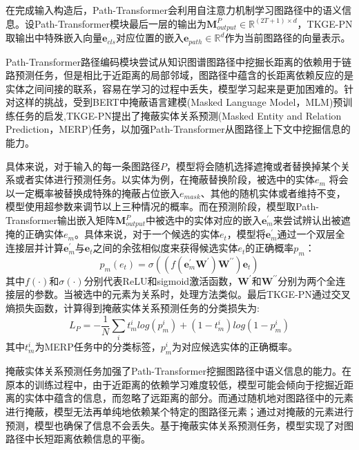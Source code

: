 在完成输入构造后，Path-Transformer会利用自注意力机制学习图路径中的语义信息。设Path-Transformer模块最后一层的输出为$\mathbf{M}_{output}^{P}\in\mathbb{R}^{(2T+1)\times d}$，TKGE-PN取输出中特殊嵌入向量$\boldsymbol{e}_{cls}$对应位置的嵌入$\boldsymbol{e}_{path}\in\mathbb{R}^d$作为当前图路径的向量表示。

Path-Transformer路径编码模块尝试从知识图谱图路径中挖掘长距离的依赖用于链路预测任务，但是相比于近距离的局部邻域，图路径中蕴含的长距离依赖反应的是实体之间间接的联系，容易在学习的过程中丢失，模型学习起来是更加困难的。针对这样的挑战，受到BERT中掩蔽语言建模(Masked Language Model，MLM)预训练任务的启发,TKGE-PN提出了掩蔽实体关系预测(Masked Entity and Relation Prediction，MERP)任务，以加强Path-Transformer从图路径上下文中挖掘信息的能力。

具体来说，对于输入的每一条图路径$P$，模型将会随机选择遮掩或者替换掉某个关系或者实体进行预测任务。以实体为例，在掩蔽替换阶段，被选中的实体$e_m$ 将会以一定概率被替换成特殊的掩蔽占位嵌入$e_{mask}$、其他的随机实体或者维持不变，模型使用超参数来调节以上三种情况的概率。而在预测阶段，模型取Path-Transformer输出嵌入矩阵$\mathbf{M}_{output}^{P}$中被选中的实体对应的嵌入$\boldsymbol{e}_{m}^\prime$来尝试辨认出被遮掩的正确实体$e_m$。具体来说，对于一个候选的实体$e_t$，模型将$\boldsymbol{e}_{m}^\prime$通过一个双层全连接层并计算$\boldsymbol{e}_{m}^\prime$与$\boldsymbol{e}_{t}$之间的余弦相似度来获得候选实体$e_t$的正确概率$p_m$：
\begin{equation}
  p_m(e_t)=\sigma((f(\boldsymbol{e}_m^\prime\mathbf{W}^{\prime})\mathbf{W}^{\prime\prime})\boldsymbol{e}_t)
\end{equation}
其中$f (\cdot)$和$\sigma(\cdot)$分别代表ReLU和sigmoid激活函数，$\mathbf{W}^{\prime}$和$\mathbf{W}^{\prime\prime}$分别为两个全连接层的参数。当被选中的元素为关系时，处理方法类似。最后TKGE-PN通过交叉熵损失函数，计算得到掩蔽实体关系预测任务的分类损失为:
\begin{equation}
  L_{P} = -\frac{1}{N}\sum\limits_{i}t_m^ilog(p_m^i)+(1-t_m^i)log(1-p_m^i)
\end{equation}
其中$t_m^i$为MERP任务中的分类标签，$p_m^i$为对应候选实体的正确概率。

掩蔽实体关系预测任务加强了Path-Transformer挖掘图路径中语义信息的能力。在原本的训练过程中，由于近距离的依赖学习难度较低，模型可能会倾向于挖掘近距离的实体中蕴含的信息，而忽略了远距离的部分。而通过随机地对图路径中的元素进行掩蔽，模型无法再单纯地依赖某个特定的图路径元素；通过对掩蔽的元素进行预测，模型也确保了信息不会丢失。基于掩蔽实体关系预测任务，模型实现了对图路径中长短距离依赖信息的平衡。

